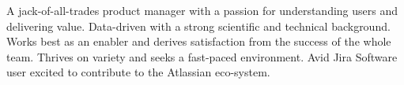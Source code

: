 

\begin{cvparagraph}


  A jack-of-all-trades product manager with a passion for understanding users and delivering value. Data-driven with a strong scientific and technical background. Works best as an enabler and derives satisfaction from the success of the whole team. Thrives on variety and seeks a fast-paced environment. Avid Jira Software user excited to contribute to the Atlassian eco-system.
\end{cvparagraph}
